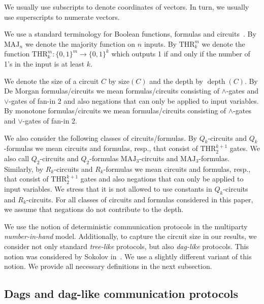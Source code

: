 \documentclass[11pt]{article}
\numberwithin{equation}{section}
\theoremstyle{definition}
\theoremstyle{plain}
\def\MAJ{\mathrm{MAJ}}
\def\THR{\mathrm{THR}}
\DeclareMathOperator{\depth}{depth}  %
\begin{document}
We usually use subscripts to denote coordinates of vectors. In turn, we usually use superscripts to numerate vectors.

 We use a standard terminology for Boolean functions, formulas and circuits~\cite{Jukna}. By $\MAJ_n$ we denote the majority function on $n$ inputs. By $\THR^m_k$ we denote the function $\THR^m_k\colon\{0,1\}^m\to\{0,1\}^k$ which outputs 1 if and only if the number of 1's in the input is at least $k$.

We denote the size of a circuit $C$ by $\mathrm{size}(C)$ and the depth by $\depth(C)$. By De Morgan formulas/circuits we mean formulas/circuits consisting of $\land$-gates and $\lor$-gates of fan-in 2 and also negations that can only be applied to input variables. By monotone formulas/circuits we mean formulas/circuits consisting of $\land$-gates and $\lor$-gates of fan-in 2.

We also consider the following classes of circuits/formulas.
By $Q_k$-circuits %
and $Q_k$-formulas %
we mean circuits %
and formulas, resp.,  %
that consist of $\THR^{k + 1}_2$ gates. We also call $Q_2$-circuits and $Q_2$-formulas $\MAJ_3$-circuits and $\MAJ_3$-formulas.  Similarly, by $R_k$-circuits %
and $R_k$-formulas   %
we mean circuits %
and formulas, resp.,   %
%
that consist of $\THR^{k + 1}_2$ gates and also negations that can only be applied to input variables. We stress that it is not allowed to use constants in $Q_k$-circuits and $R_k$-circuits. For all classes of circuits and formulas considered in this paper, we assume that negations do not contribute to the depth.



We use the notion of deterministic communication protocols in the multiparty \emph{number-in-hand} model. Additionally, to capture the circuit size in our results, we consider not only standard \emph{tree-like} protocols, but also \emph{dag-like} protocols. This notion was considered by Sokolov in~\cite{Sok2017}. We use a  slightly different variant of this notion. We provide all necessary definitions in the next subsection.


\subsection{Dags and dag-like communication protocols}
\end{document}
